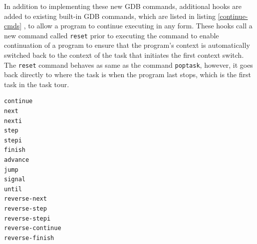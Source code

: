 In addition to implementing these new GDB commands, additional hooks are added
to existing built-in GDB commands, which are listed in listing
\ref{continue-cmds} \cite{Reference14}, to allow
a program to continue executing in any form. These hooks
call a new command called \verb|reset| prior to executing the command to enable
continuation of a program to ensure that
the program's context is automatically switched back to the context of the task
that initiates the first context switch. The \verb|reset| command behaves as
same as the command \verb|poptask|, however, it goes back directly to where the
task is when the program last stops, which is the first task in the task tour.

\begin{lstlisting}[caption={Built-in GDB commands that allow continuation of a
program}, label={continue-cmds}]
continue
next
nexti
step
stepi
finish
advance
jump
signal
until
reverse-next
reverse-step
reverse-stepi
reverse-continue
reverse-finish
\end{lstlisting}


